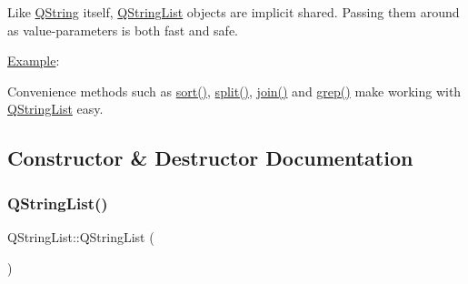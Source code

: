Like \mbox{\hyperlink{class_q_string}{Q\+String}} itself, \mbox{\hyperlink{class_q_string_list}{Q\+String\+List}} objects are implicit shared. Passing them around as value-\/parameters is both fast and safe.

\mbox{\hyperlink{struct_example}{Example}}\+: 
\begin{DoxyCode}{0}
\DoxyCodeLine{}
\DoxyCodeLine{\textcolor{comment}{// three different ways of appending values:}}
\DoxyCodeLine{}
\DoxyCodeLine{\textcolor{comment}{// sort the list, Arnt's now first}}
\DoxyCodeLine{}
\DoxyCodeLine{\textcolor{comment}{// print it out}}
\DoxyCodeLine{\}}
\end{DoxyCode}


Convenience methods such as \mbox{\hyperlink{class_q_string_list_a1b3bf672d6dd980fb487e9392fdd9bd6}{sort()}}, \mbox{\hyperlink{class_q_string_list_a2c21b167a54aa8a8082996d7f18ca5bd}{split()}}, \mbox{\hyperlink{class_q_string_list_a4d14f4987725926a5c812991a27d0f91}{join()}} and \mbox{\hyperlink{class_q_string_list_ae22f5a9cd58ef6b7f99946f800625344}{grep()}} make working with \mbox{\hyperlink{class_q_string_list}{Q\+String\+List}} easy. 

\subsection{Constructor \& Destructor Documentation}
\mbox{\label{class_q_string_list_a3e6ca70816297d8ad4b7baa749a0b8e2}} 
\subsubsection{\texorpdfstring{QStringList()}{QStringList()}\hspace{0.1cm}{\footnotesize\ttfamily [1/5]}}
{\footnotesize\ttfamily Q\+String\+List\+::\+Q\+String\+List (\begin{DoxyParamCaption}{ }\end{DoxyParamCaption})\hspace{0.3cm}{\ttfamily [inline]}}

